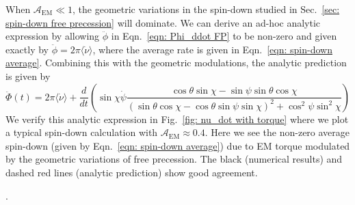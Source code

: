 \documentclass[../full_thesis/full_thesis.tex]{subfiles}
\begin{document}
When $\mathcal{A}_{\mathrm{EM}} \ll 1$, the geometric variations in the
spin-down studied in Sec.~\ref{sec: spin-down free precession} will dominate.
We can derive an ad-hoc analytic expression by allowing
$\ddot{\phi}$ in Eqn.~\eqref{eqn: Phi_ddot FP} to be non-zero and given
exactly by $\ddot{\phi} = 2\pi\langle\dot{\nu}\rangle$, where the average
rate is given in Eqn.~\eqref{eqn: spin-down average}. Combining this with the
geometric modulations, the analytic prediction is given by
\begin{equation}
    \ddot{\Phi}(t) = 2\pi \langle\dot{\nu}\rangle + \frac{d}{dt}\left(
        \sin\chi\dot{\psi} \frac{\cos\theta\sin\chi - \sin \psi \sin \theta \cos\chi
}{(\sin\theta \cos \chi - \cos \theta \sin \psi \sin \chi)^{2} + \cos^{2}\psi \sin^{2} \chi}
\right)
\label{eqn: 1238}
\end{equation}
We verify this analytic expression in Fig.~\ref{fig: nu_dot with torque} where
we plot a typical spin-down calculation with $\mathcal{A}_{\mathrm{EM}} \approx
0.4$. Here we see  the non-zero average spin-down (given by Eqn.~\eqref{eqn:
spin-down average}) due to EM torque modulated by the geometric variations of
free precession. The black (numerical results) and dashed red lines (analytic
prediction) show good agreement.

.
\end{document}
